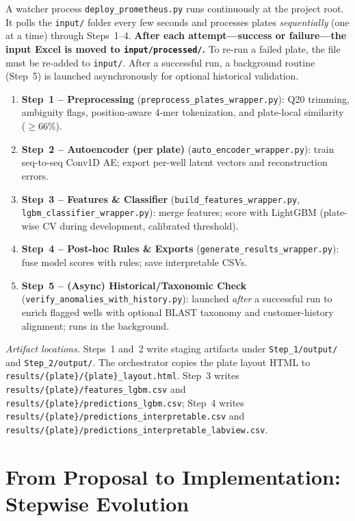 A watcher process \texttt{deploy\_prometheus.py} runs continuously at the project root. It polls the \texttt{input/} folder every few seconds and processes plates \emph{sequentially} (one at a time) through Steps~1--4. \textbf{After each attempt—success or failure—the input Excel is moved to \texttt{input/processed/}.} To re-run a failed plate, the file must be re-added to \texttt{input/}. After a successful run, a background routine (Step~5) is launched asynchronously for optional historical validation.

\begin{enumerate}
  \item \textbf{Step~1 -- Preprocessing} (\texttt{preprocess\_plates\_wrapper.py}): Q20 trimming, ambiguity flags, position-aware 4-mer tokenization, and plate-local similarity ($\geq$66\%).
  \item \textbf{Step~2 -- Autoencoder (per plate)} (\texttt{auto\_encoder\_wrapper.py}): train seq-to-seq Conv1D AE; export per-well latent vectors and reconstruction errors.
  \item \textbf{Step~3 -- Features \& Classifier} (\texttt{build\_features\_wrapper.py}, \texttt{lgbm\_classifier\_wrapper.py}): merge features; score with LightGBM (plate-wise CV during development, calibrated threshold).
  \item \textbf{Step~4 -- Post-hoc Rules \& Exports} (\texttt{generate\_results\_wrapper.py}): fuse model scores with rules; save interpretable CSVs.
  \item \textbf{Step~5 -- (Async) Historical/Taxonomic Check} (\texttt{verify\_anomalies\_with\_history.py}): launched \emph{after} a successful run to enrich flagged wells with optional BLAST taxonomy and customer-history alignment; runs in the background.
\end{enumerate}

\noindent\textit{Artifact locations.} Steps~1 and~2 write staging artifacts under \texttt{Step\_1/output/} and \texttt{Step\_2/output/}. The orchestrator copies the plate layout HTML to \texttt{results/\{plate\}/\{plate\}\_layout.html}. Step~3 writes \texttt{results/\{plate\}/features\_lgbm.csv} and \texttt{results/\{plate\}/predictions\_lgbm.csv}; Step~4 writes \texttt{results/\{plate\}/predictions\_interpretable.csv} and \texttt{results/\{plate\}/predictions\_interpretable\_labview.csv}.



\section{From Proposal to Implementation: Stepwise Evolution}
\label{sec:stepwise_evolution}

